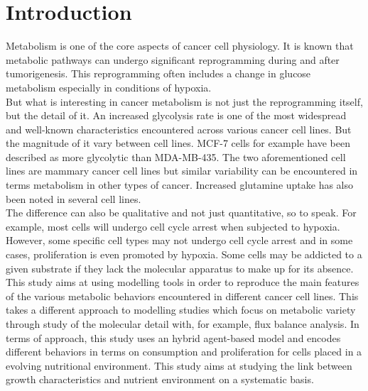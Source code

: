 \documentclass[11pt,a4paper]{article}
\begin{document}
\tableofcontents
\newpage
\section{Introduction}
Metabolism is one of the core aspects of cancer cell physiology. It is known that metabolic pathways can undergo significant reprogramming during and after tumorigenesis. This reprogramming often includes a change in glucose metabolism especially in conditions of hypoxia.\cite{Cook2021}\cite{Rodriguez2008}\cite{Griguer2005}\cite{DeBerardinis2008}\cite{Stuart2023}\\

But what is interesting in cancer metabolism is not just the reprogramming itself, but the detail of it. An increased glycolysis rate is one of the most widespread and well-known characteristics encountered across various cancer cell lines. But the magnitude of it vary between cell lines. MCF-7 cells for example have been described as more glycolytic than MDA-MB-435.\cite{Mazurek1997} The two aforementioned cell lines are mammary cancer cell lines but similar variability can be encountered in terms metabolism in other types of cancer.\cite{Kammerer2015} Increased glutamine uptake has also been noted in several cell lines.\cite{Natarajan2019}  \\

The difference can also be qualitative and not just quantitative, so to speak. For example, most cells will undergo cell cycle arrest when subjected to hypoxia.\cite{Bayar2021}\cite{Waker2018}\cite{Hubbi2015} However, some specific cell types may not undergo cell cycle arrest and in some cases, proliferation is even promoted by hypoxia.\cite{Tang2019}\cite{Miao2020}\cite{Li2023} Some cells may be addicted to a given substrate if they lack the molecular apparatus to make up for its absence.\cite{Jiang2016}\\

This study aims at using modelling tools in order to reproduce the main features of the various metabolic behaviors encountered in different cancer cell lines. This takes a different approach to modelling studies which focus on metabolic variety through study of the molecular detail with, for example, flux balance analysis.\cite{Orth2010}\cite{Ng2022}\cite{Damiani2017} In terms of approach, this study uses an hybrid agent-based model and encodes different behaviors in terms on consumption and proliferation for cells placed in a evolving nutritional environment. This study aims at studying the link between growth characteristics and nutrient environment on a systematic basis.\\
\end{document}
